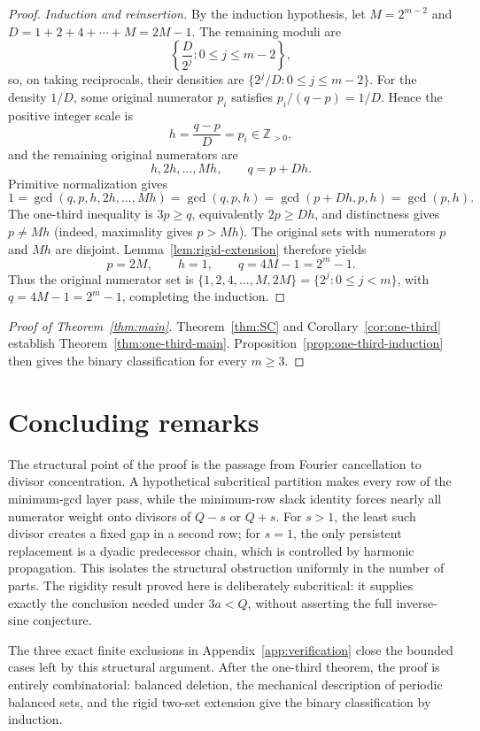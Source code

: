 \documentclass[11pt]{article}
\theoremstyle{definition}
\theoremstyle{remark}
\newcommand{\Z}{\mathbb Z}
\begin{document}
\begin{proof}
\smallskip
\noindent\emph{Induction and reinsertion.}
By the induction hypothesis, let
\(M=2^{m-2}\) and \(D=1+2+4+\cdots+M=2M-1\).  The remaining moduli are
\[
 \left\{\frac{D}{2^j}:0\le j\le m-2\right\},
\]
so, on taking reciprocals, their densities are
\(\{2^j/D:0\le j\le m-2\}\).  For the density \(1/D\), some original
numerator \(p_i\) satisfies \(p_i/(q-p)=1/D\).  Hence the positive integer
scale is
\[
 h=\frac{q-p}{D}=p_i\in\Z_{>0},
\]
and the remaining original numerators are
\[
 h,2h,\ldots,Mh,\qquad q=p+Dh.
\]
Primitive normalization gives
\[
 1=\gcd(q,p,h,2h,\ldots,Mh)
 =\gcd(q,p,h)=\gcd(p+Dh,p,h)=\gcd(p,h).
\]
The one-third inequality is \(3p\ge q\), equivalently \(2p\ge Dh\),
and distinctness gives \(p\ne Mh\) (indeed, maximality gives
\(p>Mh\)).  The original sets with numerators \(p\) and \(Mh\) are
disjoint.  Lemma~\ref{lem:rigid-extension} therefore yields
\[
 p=2M,\qquad h=1,\qquad q=4M-1=2^m-1.
\]
Thus the original numerator set is
\(\{1,2,4,\ldots,M,2M\}=\{2^j:0\le j<m\}\), with
\(q=4M-1=2^m-1\), completing the induction.
\end{proof}

\begin{proof}[Proof of Theorem~\ref{thm:main}]
Theorem~\ref{thm:SC} and Corollary~\ref{cor:one-third} establish
Theorem~\ref{thm:one-third-main}.  Proposition~\ref{prop:one-third-induction}
then gives the binary classification for every \(m\ge3\).
\end{proof}

\section{Concluding remarks}

The structural point of the proof is the passage from Fourier cancellation
to divisor concentration.  A hypothetical subcritical partition makes every
row of the minimum-gcd layer pass, while the minimum-row slack identity forces
nearly all numerator weight onto divisors of \(Q-s\) or \(Q+s\).  For
\(s>1\), the least such divisor creates a fixed gap in a second row; for
\(s=1\), the only persistent replacement is a dyadic predecessor chain,
which is controlled by harmonic propagation.  This isolates the structural
obstruction uniformly in the number of parts.  The rigidity result proved
here is deliberately subcritical: it supplies exactly the conclusion needed
under \(3a<Q\), without asserting the full inverse-sine conjecture.

The three exact finite exclusions in Appendix~\ref{app:verification} close
the bounded cases left by this structural argument.  After the one-third
theorem, the proof is entirely combinatorial: balanced deletion, the
mechanical description of periodic balanced sets, and the rigid two-set
extension give the binary classification by induction.
\end{document}
